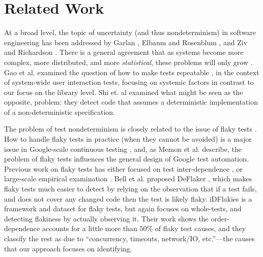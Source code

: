 \section{Related Work}

At a broad level, the topic of uncertainty (and thus nondeterminism) in software engineering has been addressed by Garlan \cite{GarlanUncertain}, Elbaum and Rosenblum \cite{Unknowns,lu2015roundtable}, and Ziv and Richardson \cite{UncertaintyPrinciple}.  There is a general agreement that as systems become more complex, more distributed, and more \emph{statistical}, these problems will only grow \cite{lu2015roundtable}.
Gao et al. examined the question of how to make tests repeatable \cite{Gao:2015:MSU:2818754.2818764}, in the context of system-wide user interaction tests, focusing on systemic factors in contrast to our focus on  the library level.  
Shi et. al \cite{DetermImp} examined what might be seen as the opposite, problem:  they detect code that assumes a deterministic implementation of a non-deterministic specification.  %

The problem of test nondeterminism is closely related to the issue of flaky tests \cite{miccoflaky, luo2014empirical,palomba2017does,listfieldtestanalysis}.  How to handle flaky tests in practice (when they cannot be avoided) is a major issue in Google-scale continuous testing \cite{memon2017taming}, and, as Memon et al. describe, the problem of flaky tests influences the general design of Google test automation.
Previous work on flaky tests has either focused on test inter-dependence \cite{LamZE2015}, or large-scale empirical examination \cite{luo2014empirical,palomba2017does}.  
Bell et al. proposed DeFlaker \cite{bell2018d}, which makes flaky tests much easier to detect by relying on the observation that if a test fails, and does not cover any changed code then the test is likely flaky.   iDFlakies \cite{idflakies} is a framework and dataset for flaky tests, but again focuses on whole-tests, and detecting flakiness by actually observing it.  Their work shows the order-dependence accounts for a little more than 50\% of flaky test causes, and they classify the rest as due to ``concurrency, timeouts,
network/IO, etc.''---the causes that our approach focuses on identifying.

